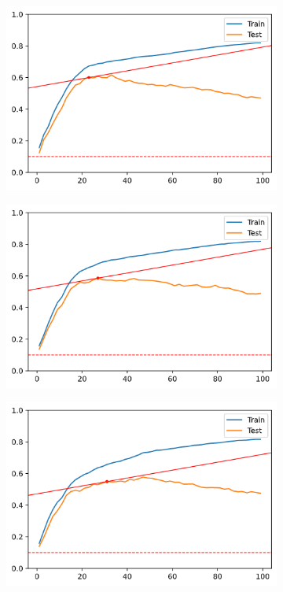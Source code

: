\begin{figure}[h]
    \centering
    \begin{subfigure}[b]{0.4\linewidth}
        \includegraphics[width=\linewidth]{img/ch5/multi/w-l1.png}
    \end{subfigure}
    \begin{subfigure}[b]{0.4\linewidth}
        \includegraphics[width=\linewidth]{img/ch5/multi/w-l2.png}
    \end{subfigure}
    \begin{subfigure}[b]{0.4\linewidth}
        \includegraphics[width=\linewidth]{img/ch5/multi/w-l3.png}

\end{subfigure}
\end{figure}
